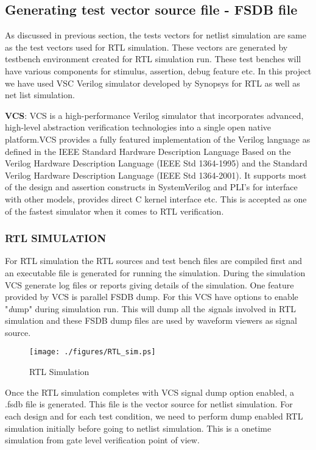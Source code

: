 \subsection{Generating test vector source file - FSDB file}
As discussed in previous section, the tests vectors for netlist simulation are same as the test vectors used for RTL simulation. These vectors are generated by testbench environment created for RTL simulation run. These test benches will have various components for stimulus, assertion, debug feature etc. In this project we have used VSC Verilog simulator developed by Synopsys for RTL as well as net list simulation. 

{\bf VCS}: VCS is a high-performance Verilog simulator that  incorporates advanced, high-level abstraction verification  technologies into a single open native platform.VCS provides a fully featured implementation of the Verilog language as defined in the IEEE Standard Hardware Description Language Based on the Verilog Hardware Description Language (IEEE Std 1364-1995) and the Standard Verilog Hardware Description Language (IEEE Std 1364-2001). It supports most of the design and assertion constructs in SystemVerilog and PLI's for interface with other models, provides direct C kernel interface etc.  This is accepted as one of the fastest simulator when it comes to RTL verification. 

\subsubsection{RTL SIMULATION}

For RTL simulation the RTL sources and test bench files are compiled first and an executable file is generated for running the simulation. During the simulation VCS generate log files or reports giving details of the simulation. One feature provided by VCS is parallel FSDB dump. For this VCS have options to enable "{\emph dump}" during simulation run. This will dump all the {\emph signals} involved in RTL simulation and these FSDB dump files are used by waveform viewers as signal source.

\begin{figure}[h]
\centering
\texttt{[image: ./figures/RTL\_sim.ps]}
\caption{RTL Simulation}
\label{fig:RTL_sim.eps}
\end{figure}



Once the RTL simulation completes with VCS signal dump option enabled, a .fsdb file is generated. This file is the vector source for netlist simulation. For each design and for each test condition, we need to perform dump enabled RTL simulation initially before going to netlist simulation. This is a onetime simulation from gate level verification point of view.


